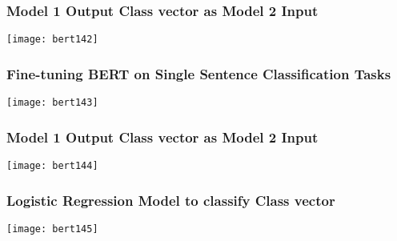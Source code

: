 \begin{frame}[fragile]\frametitle{ Model 1 Output Class vector as Model 2 Input}

			\begin{center}
			\texttt{[image: bert142]}
			\end{center}	


\end{frame}

\begin{frame}[fragile]\frametitle{ Fine-tuning BERT on Single Sentence Classification Tasks}

			\begin{center}
			\texttt{[image: bert143]}
			\end{center}	


\end{frame}

\begin{frame}[fragile]\frametitle{ Model 1 Output Class vector as Model 2 Input}

			\begin{center}
			\texttt{[image: bert144]}
			\end{center}	


\end{frame}

\begin{frame}[fragile]\frametitle{ Logistic Regression Model to classify Class vector }

			\begin{center}
			\texttt{[image: bert145]}
			\end{center}	


\end{frame}

